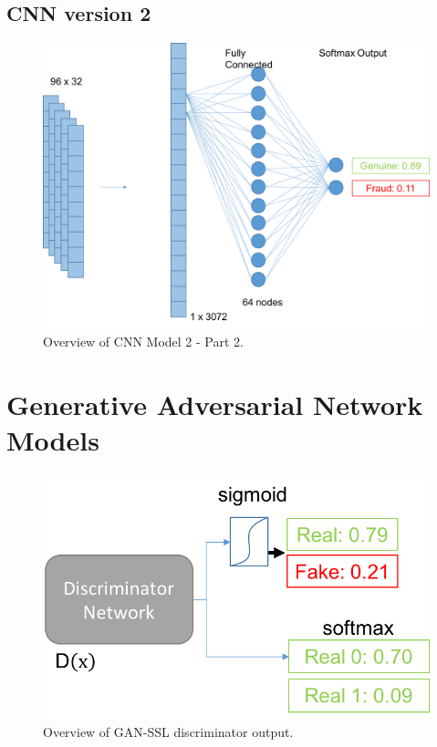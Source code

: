 \documentclass[12pt,a4paper,twoside]{report}
\begin{document}
\subsection{CNN version 2}
\begin{figure}[H]
\centering
\includegraphics[scale=0.6]{cnnv2-2}
\caption{Overview of CNN Model 2 - Part 2.}
\label{fig:cnnv2-2}
\end{figure}

\section{Generative Adversarial Network Models}

\begin{figure}[H]
\centering
\includegraphics[scale=0.8]{gan-ssl}
\caption{Overview of GAN-SSL discriminator output.}
\label{fig:gan-ssl}
\end{figure}
\end{document}
